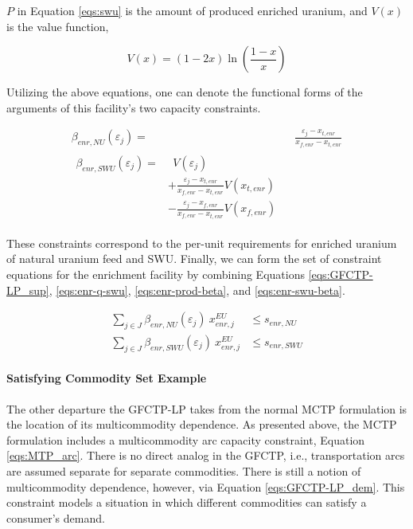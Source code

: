 $P$ in Equation \ref{eqs:swu} is the amount of produced enriched uranium, and
$V(x)$ is the value function,

\begin{equation}\label{eqs:value}
  V(x) = (1-2x) \ln \left(\frac{1-x}{x}\right)
\end{equation}

Utilizing the above equations, one can denote the functional forms of the
arguments of this facility's two capacity constraints.

\begin{align}
\label{eqs:enr-prod-beta}
\beta_{enr,NU}(\varepsilon_{j}) = & \:\: \frac{\varepsilon_{j} - x_{t,enr}}
                                      {x_{f,enr} - x_{t,enr}} \\
\begin{split}
\label{eqs:enr-swu-beta}
\beta_{enr,SWU}(\varepsilon_{j}) = & \:\: V(\varepsilon_{j}) \\
                         & + \frac{\varepsilon_{j} - x_{t,enr}}
                                  {x_{f,enr} - x_{t,enr}} V(x_{t,enr}) \\
                         & - \frac{\varepsilon_{j} - x_{f,enr}}
                                  {x_{f,enr} - x_{t,enr}} V(x_{f,enr})
\end{split}
\end{align}

These constraints correspond to the per-unit requirements for enriched uranium
of natural uranium feed and SWU. Finally, we can form the set of constraint
equations for the enrichment facility by combining
Equations \ref{eqs:GFCTP-LP_sup}, \ref{eqs:enr-q-swu},
\ref{eqs:enr-prod-beta}, and \ref{eqs:enr-swu-beta}.

\begin{align}
\label{eqs:enr-prod-constr}
\sum_{j \in J}\beta_{enr,NU}(\varepsilon_{j}) \: x_{enr,j}^{EU}  & \leq s_{enr,NU} \\
\label{eqs:enr-swu-constr}
\sum_{j \in J}\beta_{enr,SWU}(\varepsilon_{j}) \: x_{enr,j}^{EU} & \leq s_{enr,SWU}
\end{align}

\paragraph{Satisfying Commodity Set Example}

The other departure the GFCTP-LP takes from the normal MCTP formulation is the
location of its multicommodity dependence. As presented above, the
MCTP formulation includes a multicommodity arc capacity constraint, Equation
\ref{eqs:MTP_arc}. There is no direct analog in the GFCTP, i.e., transportation
arcs are assumed separate for separate commodities. There is still a notion of
multicommodity dependence, however, via Equation \ref{eqs:GFCTP-LP_dem}. This
constraint models a situation in which different commodities can satisfy a
consumer's demand.

